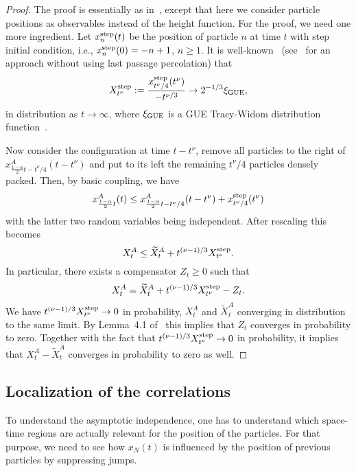 \documentclass[12pt,a4paper]{article}
\numberwithin{equation}{section}
\begin{document}
\begin{proof}
The proof is essentially as in~\cite{CFP10b}, except that here we consider particle positions as observables instead of the height function. For the proof, we need one more ingredient. Let $x^{\rm step}_n(t)$ be the position of particle $n$ at time $t$ with step initial condition, i.e., $x^{\rm step}_n(0)=-n+1$, $n\geq 1$. It is well-known~\cite{Jo00b} (see~\cite{BF07} for an approach without using last passage percolation) that
\begin{equation}
X^{\rm step}_{t^\nu}:=\frac{x^{\rm step}_{t^\nu/4}(t^\nu)}{-t^{\nu/3}}\to 2^{-1/3}\xi_{\rm GUE},
\end{equation}
in distribution as $t\to\infty$, where $\xi_{\rm GUE}$ is a GUE Tracy-Widom distribution function~\cite{TW94}.

Now consider the configuration at time $t-t^\nu$, remove all particles to the right of $x^A_{\frac{1-\alpha}{2}t-t^\nu/4}(t-t^\nu)$ and put to its left the remaining $t^\nu/4$ particles densely packed. Then, by basic coupling, we have
\begin{equation}
x^A_{\frac{1-\alpha}{2}t}(t) \leq x^A_{\frac{1-\alpha}{2}t-t^\nu/4}(t-t^\nu)+ x^{\rm step}_{t^\nu/4}(t^\nu)
\end{equation}
with the latter two random variables being independent. After rescaling this becomes
\begin{equation}
X^A_t\leq \widetilde X^A_t + t^{(\nu-1)/3}X^{\rm step}_{t^\nu}.
\end{equation}
In particular, there exists a compensator $Z_t\geq 0$ such that
\begin{equation}
X^A_t= \widetilde X^A_t + t^{(\nu-1)/3}X^{\rm step}_{t^\nu}- Z_t.
\end{equation}
We have $t^{(\nu-1)/3}X^{\rm step}_{t^\nu}\to 0$ in probability, $X^A_t$ and $\widetilde X^A_t$ converging in distribution to the same limit. By Lemma~4.1 of~\cite{BC09} this implies that $Z_t$ converges in probability to zero. Together with the fact that $t^{(\nu-1)/3}X^{\rm step}_{t^\nu}\to 0$ in probability, it implies that
$X^A_t-\widetilde X^A_t$ converges in probability to zero as well.
\end{proof}

\subsection{Localization of the correlations}\label{SectAsymptIndep}
To understand the asymptotic independence, one has to understand which space-time regions are actually relevant for the position of the particles. For that purpose, we need to see how $x_N(t)$ is influenced by the position of previous particles by suppressing jumps.
\end{document}

